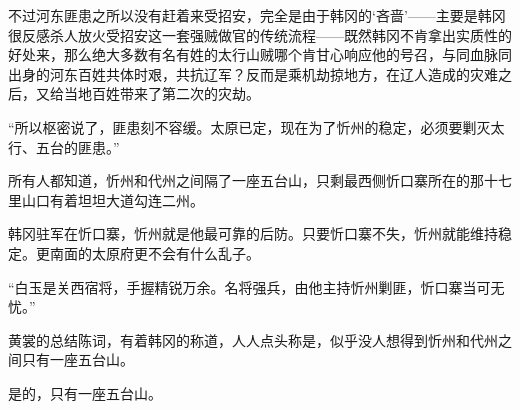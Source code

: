 不过河东匪患之所以没有赶着来受招安，完全是由于韩冈的‘吝啬’——主要是韩冈很反感杀人放火受招安这一套强贼做官的传统流程——既然韩冈不肯拿出实质性的好处来，那么绝大多数有名有姓的太行山贼哪个肯甘心响应他的号召，与同血脉同出身的河东百姓共体时艰，共抗辽军？反而是乘机劫掠地方，在辽人造成的灾难之后，又给当地百姓带来了第二次的灾劫。

“所以枢密说了，匪患刻不容缓。太原已定，现在为了忻州的稳定，必须要剿灭太行、五台的匪患。”

所有人都知道，忻州和代州之间隔了一座五台山，只剩最西侧忻口寨所在的那十七里山口有着坦坦大道勾连二州。

韩冈驻军在忻口寨，忻州就是他最可靠的后防。只要忻口寨不失，忻州就能维持稳定。更南面的太原府更不会有什么乱子。

“白玉是关西宿将，手握精锐万余。名将强兵，由他主持忻州剿匪，忻口寨当可无忧。”

黄裳的总结陈词，有着韩冈的称道，人人点头称是，似乎没人想得到忻州和代州之间只有一座五台山。

是的，只有一座五台山。
